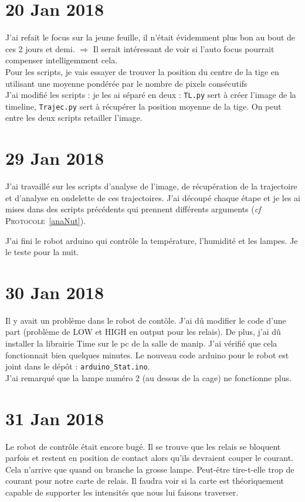 \documentclass[10pt,a4paper]{article}
\begin{document}
\section{20 Jan 2018}
J'ai refait le focus sur la jeune feuille, il n'était évidemment plus bon au bout de ces 2 jours et demi. $\Rightarrow$ Il serait intéressant de voir si l'auto focus pourrait compenser intelligemment cela.\\

Pour les scripts, je vais essayer de trouver la position du centre de la tige en utilisant une moyenne pondérée par le nombre de pixels consécutifs\\

J'ai modifié les scripts : je les ai séparé en deux : \texttt{TL.py} sert à créer l'image de la timeline, \texttt{Trajec.py} sert à récupérer la position moyenne de la tige. On peut entre les deux scripts retailler l'image.

\section{29 Jan 2018}
J'ai travaillé sur les scripts d'analyse de l'image, de récupération de la trajectoire et d'analyse en ondelette de ces trajectoires. J'ai découpé chaque étape et je les ai mises dans des scripts précédents qui prennent différents arguments (\textit{cf} \textsc{Protocole}~\ref{anaNut}).

J'ai fini le robot arduino qui contrôle la température, l'humidité et les lampes. Je le teste pour la nuit.

\section{30 Jan 2018}

Il y avait un problème dans le robot de contôle. J'ai dû modifier le code d'une part (problème de LOW et HIGH en output pour les relais). De plus, j'ai dû installer la librairie Time sur le pc de la salle de manip. J'ai vérifié que cela fonctionnait bien quelques minutes. Le nouveau code arduino pour le robot est joint dans le dépôt : \texttt{arduino\_Stat.ino}.\\

J'ai remarqué que la lampe numéro 2 (au dessus de la cage) ne fonctionne plus.

\section{31 Jan 2018}
Le robot de contrôle était encore bugé. Il se trouve que les relais se bloquent parfois et restent en position de contact alors qu'ils devraient couper le courant. Cela n'arrive que quand on branche la grosse lampe. Peut-être tire-t-elle trop de courant pour notre carte de relais. Il faudra voir si la carte est théoriquement capable de supporter les intensités que nous lui faisons traverser.\\
\end{document}
